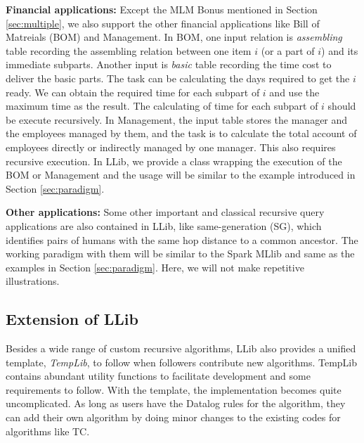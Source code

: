 \textbf{Financial   applications:}
Except the MLM Bonus mentioned in Section \ref{sec:multiple}, we also support the other financial applications like Bill of Matreials (BOM) \citep{BOM} and  Management. In BOM, one input relation is \textit{assembling} table recording the assembling relation between one item $i$ (or a part of $i$) and its immediate subparts. Another input is \textit{basic} table recording the time cost to deliver the basic parts. The task can be calculating the days required to get  the $i$ ready. We can obtain the required time for each subpart of $i$ and use the maximum time as the result. The calculating of time for each subpart of $i$ should be  execute recursively. In Management, the input table stores the manager and the employees managed by them, and the task is to calculate the total account of employees directly or indirectly managed by one manager. This also requires recursive execution. In LLib, we provide a class wrapping the execution of the BOM or Management and the usage will be similar to the example introduced in Section \ref{sec:paradigm}.

\textbf{Other applications:}
Some other important and classical recursive query applications are also contained in LLib, like same-generation (SG), which identifies pairs of humans with the same hop distance to a common ancestor.  The working paradigm with them will be similar to the Spark MLlib and same as the examples in Section \ref{sec:paradigm}. Here, we will not make repetitive illustrations.
\fi
\subsection{Extension of LLib}
Besides a wide range of custom recursive algorithms, LLib also provides a unified template, \textit{TempLib}, to follow when followers contribute  new algorithms. 
TempLib contains abundant utility functions to facilitate development and some requirements to follow. %
With the template, the implementation becomes quite uncomplicated. As long as users have the Datalog rules for the algorithm, they can add their own algorithm by doing minor changes to the existing codes for algorithms like TC. 


